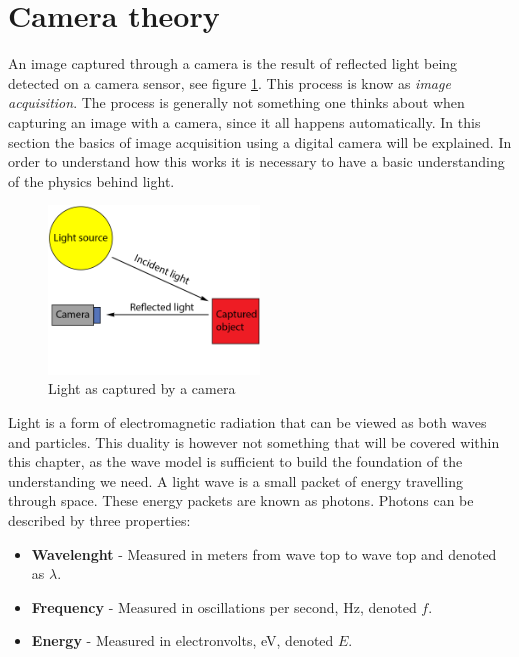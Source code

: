 \section{Camera theory}

An image captured through a camera is the result of reflected light being detected on a camera sensor, see figure \ref{fig:light_cam}. This process is know as \textit{image acquisition}. The process is generally not something one thinks about when capturing an image with a camera, since it all happens automatically. In this section the basics of image acquisition using a digital camera will be explained. In order to understand how this works it is necessary to have a basic understanding of the physics behind light.

\begin{figure}[htbp] 
\centering 
\includegraphics[width=0.5\textwidth]{Pictures/Theory/light_from_sun.png} 
\caption{Light as captured by a camera} 
\label{fig:light_cam} 
\end{figure}

Light is a form of electromagnetic radiation that can be viewed as both waves and particles. This duality is however not something that will be covered within this chapter, as the wave model is sufficient to build the foundation of the understanding we need. A light wave is a small packet of energy travelling through space. These energy packets are known as photons. Photons can be described by three properties:

\begin{itemize}
\item \textbf{Wavelenght} - Measured in meters from wave top to wave top and denoted as $\lambda$.
\item \textbf{Frequency} - Measured in oscillations per second, Hz, denoted $f$.
\item \textbf{Energy} - Measured in electronvolts, eV, denoted $E$.
\end{itemize}

